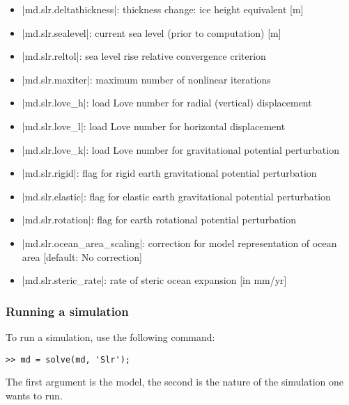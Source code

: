 \begin{itemize}
	\item \lstinlinebg|md.slr.deltathickness|: thickness change: ice height equivalent [m]
	\item \lstinlinebg|md.slr.sealevel|: current sea level (prior to computation) [m]
	\item \lstinlinebg|md.slr.reltol|: sea level rise relative convergence criterion
	\item \lstinlinebg|md.slr.maxiter|: maximum number of nonlinear iterations
	\item \lstinlinebg|md.slr.love_h|: load Love number for radial (vertical) displacement
	\item \lstinlinebg|md.slr.love_l|: load Love number for horizontal displacement
	\item \lstinlinebg|md.slr.love_k|: load Love number for gravitational potential perturbation
	\item \lstinlinebg|md.slr.rigid|: flag for rigid earth gravitational potential perturbation
	\item \lstinlinebg|md.slr.elastic|: flag for elastic earth gravitational potential perturbation
	\item \lstinlinebg|md.slr.rotation|: flag for earth rotational potential perturbation
	\item \lstinlinebg|md.slr.ocean_area_scaling|: correction for model representation of ocean area [default: No correction]
	\item \lstinlinebg|md.slr.steric_rate|: rate of steric ocean expansion [in mm/yr]
\end{itemize}

\subsubsection{Running a simulation}
To run a simulation, use the following command:
\begin{lstlisting}
>> md = solve(md, 'Slr');
\end{lstlisting}
The first argument is the model, the second is the nature of the simulation one wants to run.

\clearpage %
